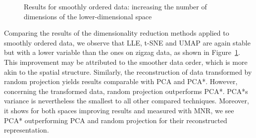 \documentclass[pdftex,12pt,a4paper]{report}
\begin{document}
\begin{figure}[!htb]
    \caption{Results for smoothly ordered data: increasing the number of dimensions of the lower-dimensional space}\label{fig:avg_dev_dyn_low_oneline}
\end{figure}

Comparing the results of the dimensionality reduction methods applied to smoothly ordered data, we observe that LLE, t-SNE and UMAP are again stable but with a lower variable than the ones on zigzag data, as shown in Figure~\ref{fig:avg_dev_dyn_low_oneline}.
This improvement may be attributed to the smoother data order, which is more akin to the spatial structure.
Similarly, the reconstruction of data transformed by random projection yields results comparable with PCA and PCA*.
However, concerning the transformed data, random projection outperforms PCA*.
PCA*s variance is nevertheless the smallest to all other compared techniques.
Moreover, it shows for both spaces improving results and measured with MNR, we see PCA* outperforming PCA and random projection for their reconstructed representation.
\end{document}
